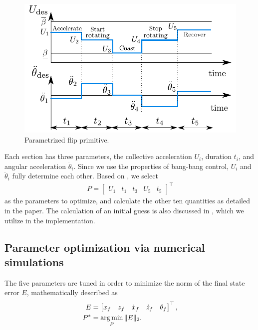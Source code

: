 \begin{figure}
\centering
\includegraphics[scale=.7]{Fig/sections2.pdf}
\caption{Parametrized flip primitive.}\label{fig:sections}
\end{figure}

Each section has three parameters, the collective acceleration $U_i$, duration $t_i$, and angular acceleration $\ddot{\theta}_i$. Since we use the properties of bang-bang control, $U_i$ and $\ddot{\theta}_i$ fully determine each other. Based on \cite{LSICRA2010}, we select 
\begin{align}
P=\begin{bmatrix}
U_1 & t_1 & t_3 & U_5& t_5
\end{bmatrix} ^\top
\end{align} as the parameters to optimize, and calculate the other ten quantities as detailed in the paper. The calculation of an initial guess is also discussed in \cite{LSICRA2010}, which we utilize in the implementation.

\subsection{Parameter optimization via numerical simulations}
The five parameters are tuned in order to minimize the norm of the final state error $E$, mathematically described as
\begin{subequations}\label{eq:optim}
\begin{align}
E &= \begin{bmatrix}
x_f & z_f & \dot{x}_f & \dot{z}_f & \theta_f
\end{bmatrix}^\top,\\
P^* &= \operatorname*{arg\,min}_P \|E\|_2.
\end{align} 
\end{subequations}

